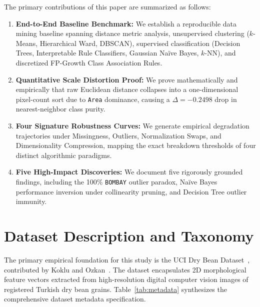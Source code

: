 \documentclass[11pt,a4paper]{article}
\begin{document}
The primary contributions of this paper are summarized as follows:
\begin{enumerate}[leftmargin=1.5em]
    \item \textbf{End-to-End Baseline Benchmark:} We establish a reproducible data mining baseline spanning distance metric analysis, unsupervised clustering ($k$-Means, Hierarchical Ward, DBSCAN), supervised classification (Decision Trees, Interpretable Rule Classifiers, Gaussian Naïve Bayes, $k$-NN), and discretized FP-Growth Class Association Rules.
    \item \textbf{Quantitative Scale Distortion Proof:} We prove mathematically and empirically that raw Euclidean distance collapses into a one-dimensional pixel-count sort due to \texttt{Area} dominance, causing a $\Delta = -0.2498$ drop in nearest-neighbor class purity.
    \item \textbf{Four Signature Robustness Curves:} We generate empirical degradation trajectories under Missingness, Outliers, Normalization Swaps, and Dimensionality Compression, mapping the exact breakdown thresholds of four distinct algorithmic paradigms.
    \item \textbf{Five High-Impact Discoveries:} We document five rigorously grounded findings, including the 100\% \texttt{BOMBAY} outlier paradox, Naïve Bayes performance inversion under collinearity pruning, and Decision Tree outlier immunity.
\end{enumerate}

\section{Dataset Description and Taxonomy}
\label{sec:dataset_description}

The primary empirical foundation for this study is the UCI Dry Bean Dataset~\citep{uci2020drybean}, contributed by Koklu and Ozkan~\citep{koklu2020multiclass}. The dataset encapsulates 2D morphological feature vectors extracted from high-resolution digital computer vision images of registered Turkish dry bean grains. Table~\ref{tab:metadata} synthesizes the comprehensive dataset metadata specification.
\end{document}
